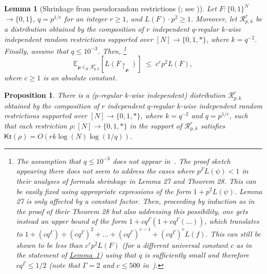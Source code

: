 \documentclass[11pt]{article}
\numberwithin{equation}{section}
\newtheorem{lemma}[theorem]{Lemma}
\newtheorem{proposition}[theorem]{Proposition}
\theoremstyle{definition}
\theoremstyle{plain}
\newcommand{\expref}[2]{\hyperref[#2]{#1~\ref{#2}}}
\newcommand{\Kt}{\mathsf{Kt}}
\begin{document}
\begin{lemma}[Shrinkage from pseudorandom restrictions ({\cite[Theorem 28]{DBLP:conf/coco/HiraharaS17}}; see \cite{DBLP:conf/focs/ImpagliazzoMZ12, DBLP:journals/siamcomp/KomargodskiRT17})] \label{l:shrinkage}
%
%
Let $F \colon \{0,1\}^N$ $\to \{0,1\}$,  %
$q = p^{1/r}$ for an integer $r \geq 1$, and $L(F) \cdot p^2 \geq 1$. Moreover, let $\mathcal{R}^r_{p,k}$ be a distribution obtained by the composition of $r$ independent $q$-regular $k$-wise independent random restrictions supported over $[N] \to \{0,1,*\}$, where $k = q^{-2}$. Finally, assume that $q \leq 10^{-3}$. Then,
\footnote{The assumption that $q \leq 10^{-3}$ does not appear in~\cite[Theorem 28]{DBLP:conf/coco/HiraharaS17}. The proof sketch appearing there does not seem to address the cases where $p^\Gamma L(\psi) < 1$ in their analyses of formula shrinkage in Lemma 27 and Theorem 28. This can be easily fixed using appropriate expressions of the form $1 + p^2 L(\psi)$. Lemma 27 is only affected by a constant factor. Then, proceeding by induction as in the proof of their Theorem 28 but also addressing this possibility, one gets instead an upper bound of the form $1 + cq^\Gamma(1 + cq^\Gamma (\ldots))$, which translates to $1 + (cq^\Gamma) + (cq^\Gamma)^2 + \ldots + (cq^\Gamma)^{r - 1} + (cq^\Gamma)^r L(f)$.
%
This can still be shown to be less than  %
$c^r p^2 L(F)$ (for a different universal constant $c$ as in the statement of \expref{Lemma}{l:shrinkage}) using that $q$ is sufficiently small and therefore $cq^\Gamma \leq 1/2$ (note that $\Gamma = 2$ and $c \leq 500$ in~\cite{DBLP:conf/coco/HiraharaS17}).}
$$
\mathbb{E}_{\bm{\rho} \in_R \mathcal{R}^r_{p,k}}[L(F\!\upharpoonright_{\bm{\rho}})] \; \leq \; c^r p^2 L(F),
$$
where $c \geq 1$ is an absolute constant.
\end{lemma}



\begin{proposition}\label{p:composed_restriction_kt}
There is a \emph{(}$p$-regular $k$-wise independent\emph{)} distribution $\mathcal{R}^r_{p,k}$ obtained by the composition of $r$ independent $q$-regular $k$-wise independent random restrictions supported over $[N] \to \{0,1,*\}$, where $k = q^{-2}$ and $q = p^{1/r}$, such that each  restriction $\rho \colon [N] \to \{0,1,*\}$ in the support of $\mathcal{R}^r_{p,k}$ satisfies $\Kt(\rho) = O(r k \log (N) \log (1/q))$. 
\end{proposition}
\end{document}
